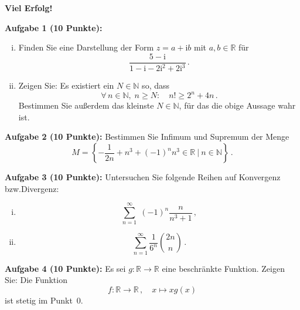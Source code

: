 \documentclass[12pt,a4paper]{scrartcl}%
\def\rmi{\mathrm{i}}
\newcommand{\R}{{\mathbb R}}
\newcommand{\N}{{\mathbb N}}
\begin{document}
\begin{center}
 \textbf{Viel Erfolg!}
\end{center}




\newpage
\thispagestyle{empty}


\textbf{Aufgabe 1 (10 Punkte):} 
\begin{enumerate}[(i)]
    \item Finden Sie eine Darstellung der Form $z=a+\rmi b$ mit $a, b \in\R$ f\"ur \begingroup
    \large
    \begin{equation*}
    \frac{5-\rmi}{1-\rmi-2\rmi^2+2\rmi^3}\,.
    \end{equation*}
    \endgroup
    \item Zeigen Sie: Es existiert ein $N\in\N$ so, dass 
    \begingroup
    \large
    \begin{equation*}
    \forall\, n\in \N, \; n\geq N: \quad n!\geq 2^{n}+4n\,.
    \end{equation*}
    \endgroup
    Bestimmen Sie au{\ss}erdem das kleinste $N\in \N $, f\"ur das die obige Aussage wahr ist.
\end{enumerate}



\bigskip\bigskip 



\textbf{Aufgabe 2 (10 Punkte):} 
Bestimmen Sie Infimum und Supremum der Menge
\begingroup
    \large
    \begin{equation*}
    M =\left\lbrace -\frac{1}{2n}+n^3+(-1)^nn^3 \in \R\ \Bigg\vert\  n\in \N \right\rbrace\,.
\end{equation*}
\endgroup



\bigskip\bigskip 



\textbf{Aufgabe 3  (10 Punkte):} 
Untersuchen Sie folgende Reihen auf Konvergenz bzw.\@ Divergenz:
\begin{enumerate}[(i)]
    \item \begingroup
    \large
    \begin{equation*} \sum\limits_{n=1}^\infty\; (-1)^n \frac{n}{n^3+1}\,,
    \end{equation*}
    \endgroup
    \item \begingroup
    \large
    \begin{equation*} \sum\limits_{n=1}^\infty \frac{1}{6^n}\binom{2n}{n}\,.
    \end{equation*}
    \endgroup
\end{enumerate}



\bigskip\bigskip 




\textbf{Aufgabe 4 (10 Punkte):} 
Es sei $g\colon \R\to \R$ eine beschr\"ankte Funktion. Zeigen Sie: Die Funktion
\begingroup
\large
\[
 f\colon \R\to\R\,,\quad x\mapsto xg(x)
\]
\endgroup
ist stetig im Punkt~$0$.
\end{document}
